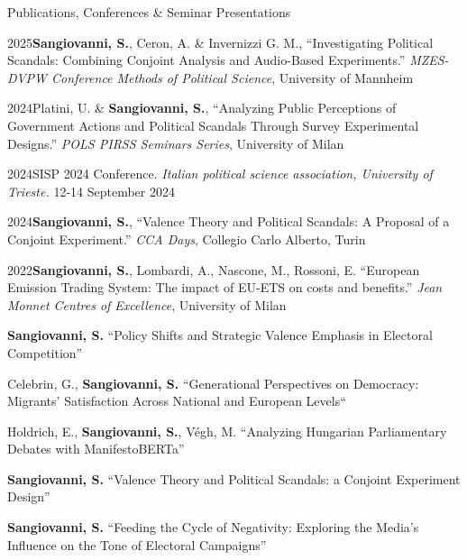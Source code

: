 \documentclass{cv} %
\begin{document}
\begin{rSection}{Publications, Conferences \& Seminar Presentations}
\subtitle{Conferences \& Seminar Presentations}

\begin{rPresSection}{2025}{\textbf{Sangiovanni, S.}, Ceron, A. \& Invernizzi G. M., “Investigating Political Scandals: Combining Conjoint Analysis and Audio-Based Experiments.” \textit{MZES-DVPW Conference Methods of Political Science}, University of Mannheim}
\end{rPresSection}
\begin{rPresSection}{2024}{Platini, U. \& \textbf{Sangiovanni, S.}, “Analyzing Public Perceptions of Government Actions and Political Scandals Through Survey Experimental Designs.” \textit{POLS PIRSS Seminars Series}, University of Milan}
\end{rPresSection}
\begin{rPresSection}{2024}{SISP 2024 Conference. \textit{Italian political science association, University of Trieste.} 12-14 September 2024}
\end{rPresSection}
\begin{rPresSection}{2024}{\textbf{Sangiovanni, S.}, “Valence Theory and Political Scandals: A Proposal of a Conjoint Experiment.” \textit{CCA Days}, Collegio Carlo Alberto, Turin}
\end{rPresSection}
\begin{rPresSection}{2022}{\textbf{Sangiovanni, S.}, Lombardi, A., Nascone, M., Rossoni, E. “European Emission Trading System: The impact of EU-ETS on costs and benefits.” \textit{Jean Monnet Centres of Excellence}, University of Milan}
\end{rPresSection}

\subtitle{Working Papers}

\begin{rWPSection}       
{\textbf{Sangiovanni, S.} “Policy Shifts and Strategic Valence Emphasis in Electoral Competition”} 
\end{rWPSection}
\begin{rWPSection}
Celebrin, G., {\textbf{Sangiovanni, S.} “Generational Perspectives on Democracy: Migrants' Satisfaction Across National and European Levels“}    
\end{rWPSection}    
\begin{rWPSection}    
{Holdrich, E., \textbf{Sangiovanni, S.}, Végh, M. “Analyzing Hungarian Parliamentary Debates with ManifestoBERTa”} 
\end{rWPSection}
\begin{rWPSection}
{\textbf{Sangiovanni, S.} “Valence Theory and Political Scandals: a Conjoint Experiment Design”} 
\end{rWPSection}
\begin{rWPSection}
{\textbf{Sangiovanni, S.} “Feeding the Cycle of Negativity: Exploring the Media's Influence on the Tone of Electoral Campaigns”}
\end{rWPSection}
\end{rSection}
\end{document}

